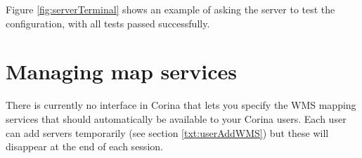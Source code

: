 Figure \ref{fig:serverTerminal} shows an example of asking the server to test the configuration, with all tests passed successfully.

\section{Managing map services}
\label{txt:managingmaps}

There is currently no interface in Corina that lets you specify the WMS mapping services that should automatically be available to your Corina users.  Each user can add servers temporarily (see section \ref{txt:userAddWMS}) but these will disappear at the end of each session.  
